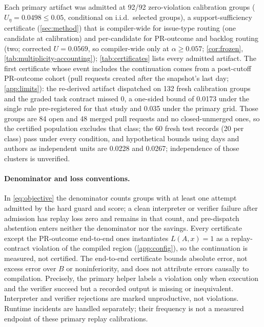 \begin{table}[t]
  \centering
  \caption{Evidence scope. Statistical statements retain their sampling and
  selection assumptions; measured savings do not certify answer quality.}
  \label{tab:evidence-scope}
  \footnotesize
  
\end{table}

Each primary artifact was admitted at 92/92 zero-violation calibration groups
($U_{\hat\eta}=0.0498\le0.05$, conditional on i.i.d.\ selected groups), a
support-sufficiency certificate (\cref{sec:method}) that is compiler-wide for
issue-type routing (one candidate at calibration) and per-candidate for
PR-outcome and backlog routing (two; corrected $U=0.0569$, so compiler-wide
only at $\alpha\ge0.057$; \cref{cor:frozen}, \cref{tab:multiplicity-accounting});
\cref{tab:certificates} lists every admitted artifact. The first certificate
whose event includes the continuation comes from a post-cutoff PR-outcome
cohort (pull requests created after the snapshot's last day;
\cref{app:limits}): the re-derived artifact dispatched on 132 fresh
calibration groups and the graded task contract missed 0, a one-sided bound of
0.0173 under the single rule pre-registered for that study and 0.035 under the
primary grid. Those groups are 84 open and 48 merged pull requests and no
closed-unmerged ones, so the certified population excludes that class; the 60
fresh test records (20 per class) pass under every condition, and hypothetical
bounds using days and authors as independent units are 0.0228 and 0.0267;
independence of those clusters is unverified.

\paragraph{Denominator and loss conventions.}
In \cref{eq:objective} the denominator counts groups with at least one attempt
admitted by the hard guard and score; a clean interpreter or verifier failure
after admission has replay loss zero and remains in that count, and
pre-dispatch abstention enters neither the denominator nor the savings. Every
certificate except the PR-outcome end-to-end ones instantiates $L(A,x)=1$ as a
replay-contract violation of the compiled region (\cref{app:config}), so the
continuation is measured, not certified. The end-to-end certificate bounds
absolute error, not excess error over $B$ or noninferiority, and does not
attribute errors causally to compilation.
Precisely, the primary helper labels a violation only when execution and the
verifier succeed but a recorded output is missing or inequivalent. Interpreter
and verifier rejections are marked unproductive, not violations. Runtime
incidents are handled separately; their frequency is not a measured endpoint
of these primary replay calibrations.

